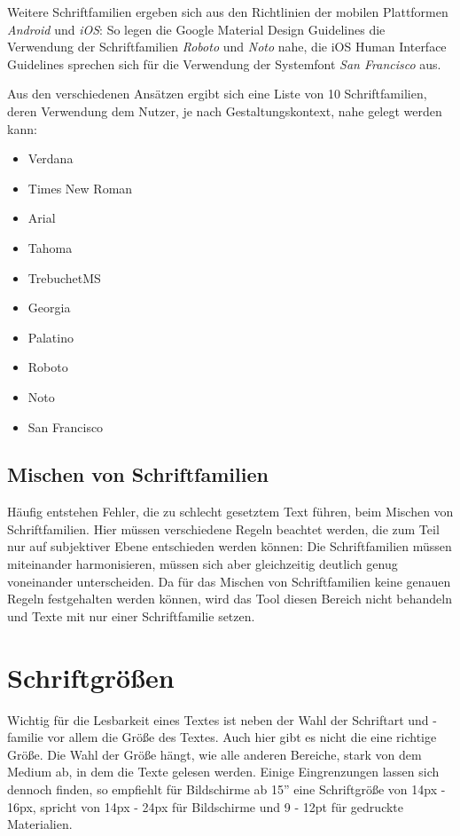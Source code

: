 Weitere Schriftfamilien ergeben sich aus den Richtlinien der mobilen Plattformen \textit{Android} und \textit{iOS}: So legen die Google Material Design Guidelines die Verwendung der Schriftfamilien \textit{Roboto} und \textit{Noto} nahe, die iOS Human Interface Guidelines sprechen sich für die Verwendung der Systemfont \textit{San Francisco} aus.

Aus den verschiedenen Ansätzen ergibt sich eine Liste von 10 Schriftfamilien, deren Verwendung dem Nutzer, je nach Gestaltungskontext, nahe gelegt werden kann:

\begin{itemize}
	\item Verdana
	\item Times New Roman
	\item Arial
	\item Tahoma
	\item TrebuchetMS
	\item Georgia
	\item Palatino
	\item Roboto
	\item Noto
	\item San Francisco
\end{itemize}

\subsection{Mischen von Schriftfamilien}

Häufig entstehen Fehler, die zu schlecht gesetztem Text führen, beim Mischen von Schriftfamilien. Hier müssen verschiedene Regeln beachtet werden, die zum Teil nur auf subjektiver Ebene entschieden werden können: Die Schriftfamilien müssen miteinander harmonisieren, müssen sich aber gleichzeitig deutlich genug voneinander unterscheiden. Da für das Mischen von Schriftfamilien keine genauen Regeln festgehalten werden können, wird das Tool diesen Bereich nicht behandeln und Texte mit nur einer Schriftfamilie setzen.


\section{Schriftgrößen}
Wichtig für die Lesbarkeit eines Textes ist neben der Wahl der Schriftart und -familie vor allem die Größe des Textes. Auch hier gibt es nicht die eine richtige Größe. Die Wahl der Größe hängt, wie alle anderen Bereiche, stark von dem Medium ab, in dem die Texte gelesen werden.
Einige Eingrenzungen lassen sich dennoch finden, so empfiehlt \cite{Runk200804} für Bildschirme ab 15” eine Schriftgröße von 14px - 16px, \cite{Lehnert201602} spricht von 14px - 24px für Bildschirme und 9 - 12pt für gedruckte Materialien.

